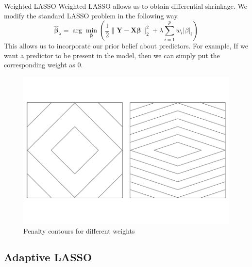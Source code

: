 \documentclass[tikz]{beamer}					%
\newcommand{\bbeta}{\bm{\beta}}
\newcommand{\hb}{\hat{\bbeta}}
\begin{document}
{
\begin{frame}{Weighted LASSO}
Weighted LASSO allows us to obtain differential shrinkage.
We modify the standard LASSO problem in the following way.
\begin{equation}
    \hb_{\lambda} = \arg\min_{\bbeta} \left(\frac{1}{2}\|\bm{Y}-\bm{X}\bbeta\|_2^2 +\lambda \sum_{i=1}^{p}w_i|\beta|_i \right)
\end{equation}
This allows us to incorporate our prior belief about predictors. For example,
If we want a predictor to be present in the model, then we can simply put the
corresponding weight as 0.
\begin{figure}
    \centering
    \includegraphics[width=.4\linewidth]{figures/shrinkage.png}
    \caption{Penalty contours for different weights}
\end{figure}
\end{frame}
}
\subsection{Adaptive LASSO}
\end{document}
